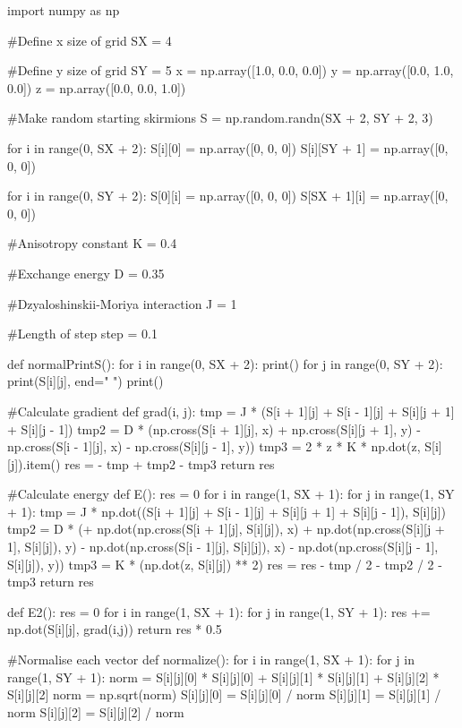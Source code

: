 \documentclass[ 12pt,x11names]{article}
\begin{document}
 \begin{python}
 import numpy as np

#Define  x size of grid
SX = 4

#Define y size of grid
SY = 5
x = np.array([1.0, 0.0, 0.0])
y = np.array([0.0, 1.0, 0.0])
z = np.array([0.0, 0.0, 1.0])

#Make random starting skirmions
S = np.random.randn(SX + 2, SY + 2, 3)

for i in range(0, SX + 2):
    S[i][0] = np.array([0, 0, 0])
    S[i][SY + 1] = np.array([0, 0, 0])

for i in range(0, SY + 2):
    S[0][i] = np.array([0, 0, 0])
    S[SX + 1][i] = np.array([0, 0, 0])

#Anisotropy constant
K = 0.4

#Exchange energy
D = 0.35

#Dzyaloshinskii-Moriya interaction
J = 1

#Length of step
step = 0.1

def normalPrintS():
    for i in range(0, SX + 2):
        print()
        for j in range(0, SY + 2):
            print(S[i][j], end=" ")
    print()

#Calculate gradient
def grad(i, j):
    tmp = J * (S[i + 1][j] + S[i - 1][j] +
        S[i][j + 1] + S[i][j - 1])
    tmp2 = D * (np.cross(S[i + 1][j], x) +
    np.cross(S[i][j + 1], y) -
    np.cross(S[i - 1][j], x) - np.cross(S[i][j - 1], y))
    tmp3 = 2 * z * K * np.dot(z, S[i][j]).item()
    res = - tmp + tmp2 - tmp3
    return res

#Calculate energy
def E():
    res = 0
    for i in range(1, SX + 1):
        for j in range(1, SY + 1):
            tmp = J * np.dot((S[i + 1][j] + S[i - 1][j] + S[i][j + 1] + S[i][j - 1]), S[i][j])
            tmp2 = D * (+ np.dot(np.cross(S[i + 1][j], S[i][j]), x)
                        + np.dot(np.cross(S[i][j + 1], S[i][j]), y)
                        - np.dot(np.cross(S[i - 1][j], S[i][j]), x)
                        - np.dot(np.cross(S[i][j - 1], S[i][j]), y))
            tmp3 = K * (np.dot(z, S[i][j]) ** 2)
            res = res - tmp / 2 - tmp2 / 2 - tmp3
    return res

def E2():
    res = 0
    for i in range(1, SX + 1):
        for j in range(1, SY + 1):
            res += np.dot(S[i][j], grad(i,j))
    return res * 0.5

#Normalise each vector
def normalize():
    for i in range(1, SX + 1):
        for j in range(1, SY + 1):
            norm = S[i][j][0] * S[i][j][0] + S[i][j][1] * S[i][j][1]
            + S[i][j][2] * S[i][j][2]
            norm = np.sqrt(norm)
            S[i][j][0] = S[i][j][0] / norm
            S[i][j][1] = S[i][j][1] / norm
            S[i][j][2] = S[i][j][2] / norm


\end{python}
\end{document}
